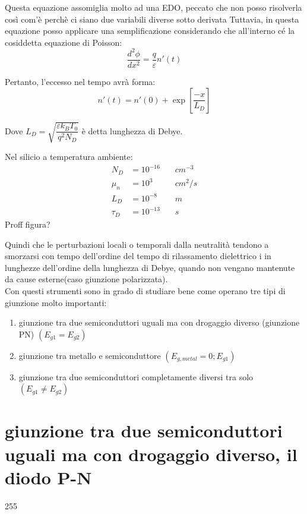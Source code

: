 Questa equazione assomiglia molto ad una EDO, peccato che non posso risolverla così com'è perchè ci siano due variabili diverse sotto derivata
Tuttavia, in questa equazione posso applicare una semplificazione considerando che all'interno cé la cosiddetta equazione di Poisson: 
\begin{equation}
    \dfrac{d^2 \phi}{dx^2} = \dfrac{q}{\varepsilon}n'(t)
\end{equation}

Pertanto, l'eccesso nel tempo avrà forma:
\begin{equation}
    n'(t)=n'(0)+\exp \left[ \frac{-x}{L_D} \right]
\end{equation}

Dove $L_D=\sqrt{\dfrac{\varepsilon k_B T_0}{q^2 N_D}}$ è detta lunghezza di Debye. \\
\begin{exbox}[Un pò di numeri]
Nel silicio a temperatura ambiente:
\begin{align*}
    N_D&=10^{-16} && \,cm^{-3}\\
    \mu_n&=10^{3} && \,cm^{2}/s\\
    L_D&=10^{-8}  && \,m\\
    \tau_D&=10^{-13} && \,s
\end{align*}
    Proff figura?
\end{exbox}

Quindi che le perturbazioni locali o temporali dalla neutralità tendono  a smorzarsi con tempo dell'ordine del tempo di rilassamento dielettrico i in lunghezze dell'ordine della lunghezza di Debye, quando non vengano mantenute da cause esterne(caso giunzione polarizzata).\\

Con questi strumenti sono in grado di studiare bene come operano tre tipi di giunzione molto importanti:
\begin{enumerate}
    \item giunzione tra due semiconduttori uguali ma con drogaggio diverso (giunzione PN) $(E_{g1} =E_{g2})$
    \item giunzione tra metallo e semiconduttore $(E_{g,metal} =0 ; E_{g1})$
    \item giunzione tra due semiconduttori completamente diversi tra solo $(E_{g1} \neq E_{g2} )$
\end{enumerate}
\cleardoublepage%

\noindent\begin{minipage}{0.9\textwidth}
    \section{giunzione tra due semiconduttori uguali ma con drogaggio diverso, il diodo P-N}
\end{minipage}
\begin{minipage}{0.1\textwidth}\raggedleft
    \begin{pgGhione}
    255
    \end{pgGhione}
\end{minipage}


